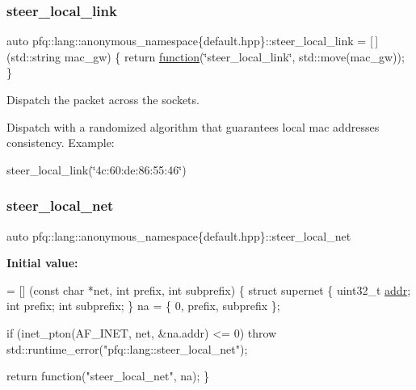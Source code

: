 \subsubsection{\texorpdfstring{steer\+\_\+local\+\_\+link}{steer\_local\_link}}
{\footnotesize\ttfamily auto pfq\+::lang\+::anonymous\+\_\+namespace\{default.\+hpp\}\+::steer\+\_\+local\+\_\+link = \mbox{[}$\,$\mbox{]}(std\+::string mac\+\_\+gw) \{ return \hyperlink{namespacepfq_1_1lang_a1a4638059d700ae08d0ca63886ff2bb3}{function}(\char`\"{}steer\+\_\+local\+\_\+link\char`\"{}, std\+::move(mac\+\_\+gw)); \}}



Dispatch the packet across the sockets. 

Dispatch with a randomized algorithm that guarantees local mac addresses consistency. Example\+:

steer\+\_\+local\+\_\+link(\char`\"{}4c\+:60\+:de\+:86\+:55\+:46\char`\"{}) \mbox{\label{namespacepfq_1_1lang_1_1anonymous__namespace_02default_8hpp_03_a9c26772930b75805453c19d0d5129c71}} 
\subsubsection{\texorpdfstring{steer\+\_\+local\+\_\+net}{steer\_local\_net}}
{\footnotesize\ttfamily auto pfq\+::lang\+::anonymous\+\_\+namespace\{default.\+hpp\}\+::steer\+\_\+local\+\_\+net}

{\bfseries Initial value\+:}
\begin{DoxyCode}
= [] (\textcolor{keyword}{const} \textcolor{keywordtype}{char} *net, \textcolor{keywordtype}{int} prefix, \textcolor{keywordtype}{int} subprefix)
        \{
            \textcolor{keyword}{struct }supernet \{
                uint32\_t \hyperlink{namespacepfq_1_1lang_1_1anonymous__namespace_02default_8hpp_03_a13cabe468839119d8d68540e3c60718b}{addr};
                \textcolor{keywordtype}{int}      prefix;
                \textcolor{keywordtype}{int}      subprefix;
            \} na = \{ 0, prefix, subprefix \};

            \textcolor{keywordflow}{if} (inet\_pton(AF\_INET, net, &na.addr) <= 0)
                \textcolor{keywordflow}{throw} std::runtime\_error(\textcolor{stringliteral}{"pfq::lang::steer\_local\_net"});

            \textcolor{keywordflow}{return} \textcolor{keyword}{function}(\textcolor{stringliteral}{"steer\_local\_net"}, na);
        \}
\end{DoxyCode}


